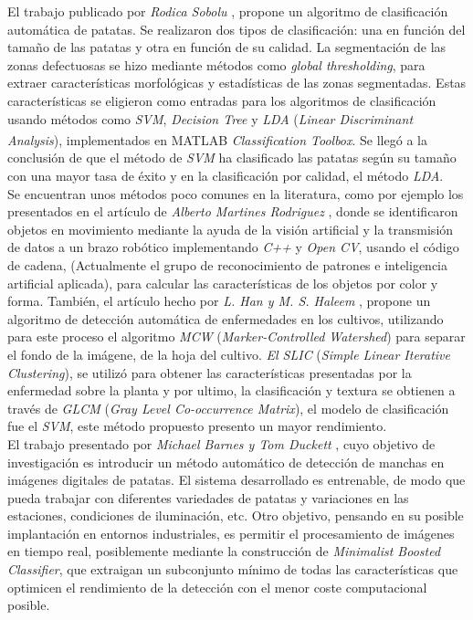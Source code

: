 El trabajo publicado por \textit{Rodica Sobolu} \cite{sobolu2020automatic}, propone un algoritmo de clasificación automática de patatas. Se realizaron dos tipos de clasificación: una en función del tamaño de las patatas y otra en función de su calidad. La segmentación de las zonas defectuosas se hizo mediante métodos como \textit{global thresholding}, para extraer características morfológicas y estadísticas de las zonas segmentadas. Estas características se eligieron como entradas para los algoritmos de clasificación usando métodos como \textit{SVM}, \textit{Decision  Tree} y \textit{LDA} (\textit{Linear Discriminant Analysis}), implementados en MATLAB\textsuperscript{\textregistered} \textit{Classification Toolbox}. Se llegó a la conclusión de que el método de \textit{SVM} ha clasificado las patatas según su tamaño con una mayor tasa de éxito y en la clasificación por calidad, el método \textit{LDA}.\\

Se encuentran unos métodos poco comunes en la literatura, como por ejemplo los presentados en el artículo de \textit{Alberto Martines Rodriguez} \cite{article5}, donde se identificaron objetos en movimiento mediante la ayuda de la visión artificial y la transmisión de datos a un brazo robótico implementando \textit{C++} y \textit{Open CV}, usando el código de cadena, (Actualmente el grupo de reconocimiento de patrones e inteligencia artificial aplicada), para calcular las características de los objetos por color y forma. También, el artículo hecho por \textit{L. Han y M. S. Haleem} \cite{7237209}, propone un algoritmo de detección automática de enfermedades en los cultivos, utilizando para este proceso el algoritmo \textit{MCW} (\textit{Marker-Controlled Watershed}) para separar el fondo de la imágene, de la hoja del cultivo. \textit{El SLIC} (\textit{Simple Linear Iterative Clustering}), se utilizó para obtener las características presentadas por la enfermedad sobre la planta y por ultimo, la clasificación y textura se obtienen a través de \textit{GLCM} (\textit{Gray Level Co-occurrence Matrix}), el modelo de clasificación fue el \textit{SVM}, este método propuesto presento un mayor rendimiento.\\

El trabajo presentado por \textit{Michael Barnes y Tom Duckett} \cite{Barnes2010}, cuyo objetivo de  investigación es introducir un método automático de detección de manchas en imágenes digitales de patatas. El sistema desarrollado es entrenable, de modo que pueda trabajar con diferentes variedades de patatas y variaciones en las estaciones, condiciones de iluminación, etc. Otro objetivo, pensando en su posible implantación en entornos industriales, es permitir el procesamiento de imágenes en tiempo real, posiblemente mediante la construcción de \textit{Minimalist Boosted Classifier}, que extraigan un subconjunto mínimo de todas las características que optimicen el rendimiento de la detección con el menor coste computacional posible.

